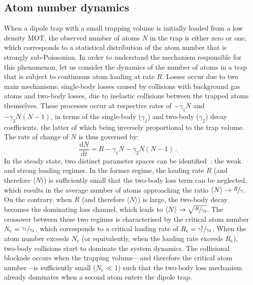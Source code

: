 \documentclass[../Thesis-IJspeert.tex]{subfiles}
\begin{document}
\subsection{Atom number dynamics}
When a dipole trap with a small trapping volume is initially loaded from a low density MOT, the observed number of atoms $N$ in the trap is either zero or one, which corresponds to a statistical distribution of the atom number that is strongly sub-Poissonian. In order to understand the mechanism responsible for this phenomenon, let us consider the dynamics of the number of atoms in a trap that is subject to continuous atom loading at rate $R$. Losses occur due to two main mechanisms: single-body losses caused by collisions with background gas atoms and two-body losses, due to inelastic collisions between the trapped atoms themselves. These processes occur at respective rates of $-\gamma_1 N$ and $-\gamma_2 N(N-1)$, in terms of the single-body ($\gamma_1$) and two-body ($\gamma_2$) decay coefficients, the latter of which being inversely proportional to the trap volume. The rate of change of $N$ is thus governed by:
\begin{equation}
\frac{\mathrm{d}N}{\mathrm{d}t} = R - \gamma_1 N - \gamma_2 N (N-1)\,.
\end{equation}
In the steady state, two distinct parameter spaces can be identified~\cite{Schlosser2002}: the weak and strong loading regimes. In the former regime, the loading rate $R$ (and therefore $\langle N \rangle$) is sufficiently small that the two-body loss term can be neglected, which results in the average number of atoms approaching the ratio $\langle N \rangle \rightarrow \sfrac{R}{\gamma} $. On the contrary, when $R$ (and therefore $\langle N \rangle$) is large, the two-body decay becomes the dominating loss channel, which leads to $\langle N \rangle \rightarrow \sqrt{ \sfrac{R}{\gamma_2} }$. The crossover between these two regimes is characterised by the critical atom number $ N_\mathrm{c} = \sfrac{\gamma_1}{\gamma_2} $, which corresponds to a critical loading rate of $ R_\mathrm{c} = \sfrac{\gamma_1^2}{\gamma_2} $. When the atom number exceeds $N_\mathrm{c}$ (or equivalently, when the loading rate exceeds $ R_\mathrm{c} $), two-body collisions start to dominate the system dynamics. The collisional blockade occurs when the trapping volume---and therefore the critical atom number---is sufficiently small ($N_\mathrm{c} \ll 1$) such that the two-body loss mechanism already dominates when a second atom enters the dipole trap.
\end{document}
